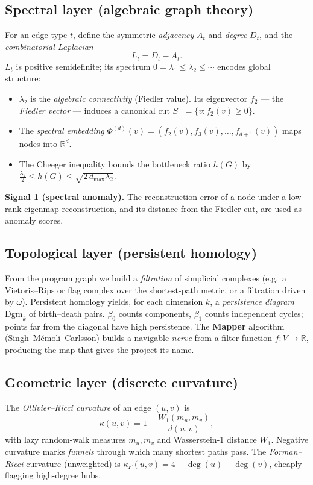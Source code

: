 \documentclass[11pt]{article}
\newcommand{\R}{\mathbb{R}}
\begin{document}
\subsection{Spectral layer (algebraic graph theory)}
For an edge type $t$, define the symmetric \emph{adjacency} $A_t$ and
\emph{degree} $D_t$, and the \emph{combinatorial Laplacian}
\[
L_t = D_t - A_t .
\]
$L_t$ is positive semidefinite; its spectrum
$0 = \lambda_1 \le \lambda_2 \le \cdots$ encodes global structure:
\begin{itemize}[leftmargin=1.5em]
  \item $\lambda_2$ is the \emph{algebraic connectivity} (Fiedler value). Its
        eigenvector $f_2$ --- the \emph{Fiedler vector} --- induces a canonical
        cut $S^+ = \{v : f_2(v) \ge 0\}$.
  \item The \emph{spectral embedding}
        $\Phi^{(d)}(v) = (f_2(v), f_3(v), \dots, f_{d+1}(v))$ maps nodes into
        $\R^d$.
  \item The Cheeger inequality bounds the bottleneck ratio $h(G)$ by
        $\tfrac{\lambda_2}{2} \le h(G) \le \sqrt{2\,d_{\max}\lambda_2}$.
\end{itemize}
\textbf{Signal 1 (spectral anomaly).} The reconstruction error of a node under a
low-rank eigenmap reconstruction, and its distance from the Fiedler cut, are
used as anomaly scores.

\subsection{Topological layer (persistent homology)}
From the program graph we build a \emph{filtration} of simplicial complexes
(e.g.\ a Vietoris--Rips or flag complex over the shortest-path metric, or a
filtration driven by $\omega$). Persistent homology yields, for each dimension
$k$, a \emph{persistence diagram} $\mathrm{Dgm}_k$ of birth--death pairs.
$\beta_0$ counts components, $\beta_1$ counts independent cycles; points far
from the diagonal have high persistence. The \textbf{Mapper} algorithm
(Singh--M\'emoli--Carlsson) builds a navigable \emph{nerve} from a filter
function $f: V \to \R$, producing the map that gives the project its name.

\subsection{Geometric layer (discrete curvature)}
The \emph{Ollivier--Ricci curvature} of an edge $(u,v)$ is
\[
\kappa(u,v) = 1 - \frac{W_1(m_u, m_v)}{d(u,v)},
\]
with lazy random-walk measures $m_u, m_v$ and Wasserstein-1 distance $W_1$.
Negative curvature marks \emph{funnels} through which many shortest paths pass.
The \emph{Forman--Ricci} curvature (unweighted) is $\kappa_F(u,v) = 4 - \deg(u)
- \deg(v)$, cheaply flagging high-degree hubs.
\end{document}
